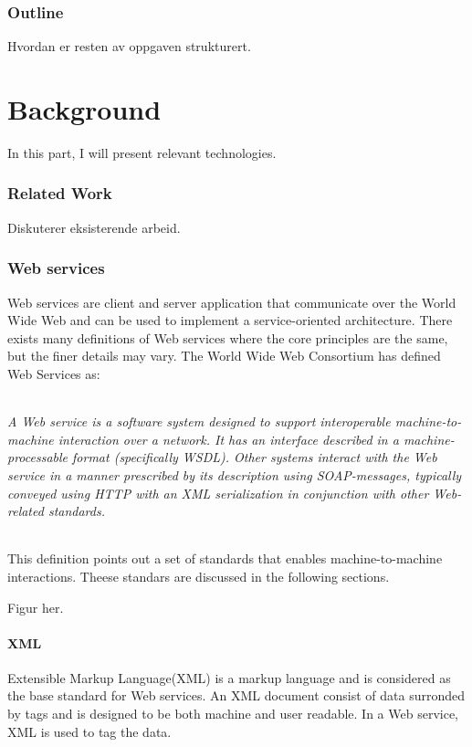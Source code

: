 \documentclass[USenglish]{article}
\begin{document}
\section{Outline}
Hvordan er resten av oppgaven strukturert.


\part{Background}
In this part, I will present relevant technologies.
\section{Related Work}
Diskuterer eksisterende arbeid.



\section{Web services}
\label{web-services}
Web services are client and server application that communicate over the World Wide Web and can be used to implement a service-oriented architecture. There exists many definitions of Web services where the core principles are the same, but the finer details may vary. The World Wide Web Consortium has defined Web Services as\cite{wrc-web-service}:
\paragraph{}
\textit{A Web service is a software system designed to support interoperable machine-to-machine interaction over a network. It has an interface described in a machine-processable format (specifically WSDL). Other systems interact with the Web service in a manner prescribed by its description using SOAP-messages, typically conveyed using HTTP with an XML serialization in conjunction with other Web-related standards.}

\paragraph{}
This definition points out a set of standards that enables machine-to-machine interactions. Theese standars are discussed in the following sections.

Figur her.

\subsection{XML}
Extensible Markup Language(XML) is a markup language and is considered as the base standard for Web services. An XML document consist of data surronded by tags and is designed to be both machine and user readable. In a Web service, XML is used to tag the data.
\end{document}
